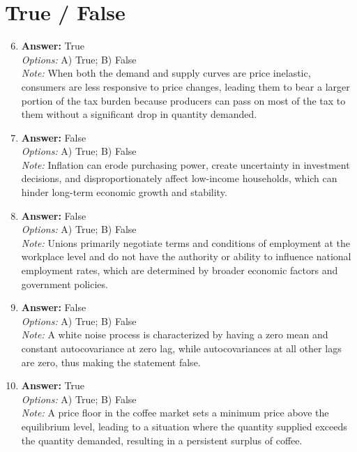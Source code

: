 \documentclass[12pt]{article}
\begin{document}
\section*{True / False}
\begin{enumerate}[label=\arabic*.]
\setcounter{enumi}{5}
\item \textbf{Answer:} True
\\ \textit{Options:} A) True; B) False
\\ \textit{Note:} When both the demand and supply curves are price inelastic, consumers are less responsive to price changes, leading them to bear a larger portion of the tax burden because producers can pass on most of the tax to them without a significant drop in quantity demanded.
\item \textbf{Answer:} False
\\ \textit{Options:} A) True; B) False
\\ \textit{Note:} Inflation can erode purchasing power, create uncertainty in investment decisions, and disproportionately affect low-income households, which can hinder long-term economic growth and stability.
\item \textbf{Answer:} False
\\ \textit{Options:} A) True; B) False
\\ \textit{Note:} Unions primarily negotiate terms and conditions of employment at the workplace level and do not have the authority or ability to influence national employment rates, which are determined by broader economic factors and government policies.
\item \textbf{Answer:} False
\\ \textit{Options:} A) True; B) False
\\ \textit{Note:} A white noise process is characterized by having a zero mean and constant autocovariance at zero lag, while autocovariances at all other lags are zero, thus making the statement false.
\item \textbf{Answer:} True
\\ \textit{Options:} A) True; B) False
\\ \textit{Note:} A price floor in the coffee market sets a minimum price above the equilibrium level, leading to a situation where the quantity supplied exceeds the quantity demanded, resulting in a persistent surplus of coffee.
\end{enumerate}
\end{document}
